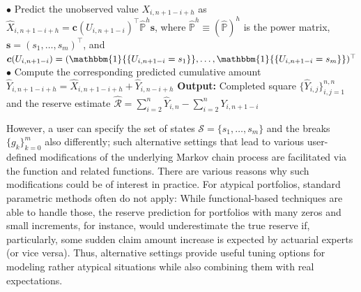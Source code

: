 \begin{algorithm}[!htb]
{{{					$\bullet$ Predict the unobserved value $X_{i,n+1-i + h}$ as $\widehat{X}_{i,n+1-i + h}=\boldsymbol{c}(U_{i,n+1-i})^\top\widehat{\mathbb{P}}^h\boldsymbol{s}$,			
						where $\widehat{\mathbb{P}}^h \equiv (\widehat{\mathbb{P}})^h$ is the power matrix, $\boldsymbol{s} = (s_1, \dots, s_{m})^\top$, and 
                            $\boldsymbol{c}(U_{i,n+1-i}) = (\mathbbm{1}{\{U_{i,n+1-i}= s_1 \}}, \dots, \mathbbm{1}{\{U_{i,n+1-i} = s_{m}\}})^\top$\\
						$\bullet$ Compute the corresponding predicted cumulative amount $\widehat{Y}_{i,n+1-i + h}=\widehat{X}_{i,n+1-i + h}+\widehat{Y}_{i,n-i + h}$
					}
				}
			}{\bf Output: } Completed square $\{\widehat{Y}_{i, j}\}_{i,j = 1}^{n,n}$ and the reserve estimate $\widehat{\mathcal{R}} = \sum_{i = 2}^n \widehat{Y}_{i,n} - \sum_{i = 2}^n Y_{i, n + 1 - i}$ 
\end{algorithm}

However, a user can specify the set of states $\mathcal{S} = \{s_1, \dots, s_m\}$ and the breaks $\{g_k\}_{k = 0}^m$ also differently; such alternative settings that lead to various user-defined modifications of the underlying Markov chain process are facilitated via the  function and related functions.
There are various reasons why such modifications could be of interest in practice. For atypical portfolios, standard parametric methods often do not apply: While functional-based techniques are able to handle those, the reserve prediction for portfolios with many zeros and small increments, for instance, would underestimate the true reserve if, particularly, some sudden claim amount increase is expected by actuarial experts (or vice versa). Thus, alternative settings provide useful tuning options for modeling rather atypical situations while also combining them with real expectations.  

